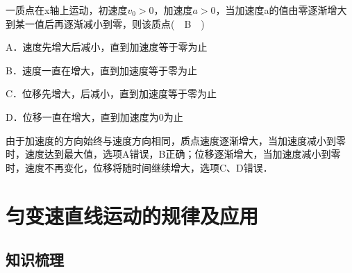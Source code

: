 \documentclass[cn,11pt]{elegantbook}
\begin{document}
\begin{enumerate}
\begin{enumerate}
         \end{enumerate}
         \begin{exercise}
            一质点在x轴上运动，初速度$v_{0}>0$，加速度$a>0$，当加速度a的值由零逐渐增大到某一值后再逐渐减小到零，则该质点(　B　)
           
            A．速度先增大后减小，直到加速度等于零为止
          
            B．速度一直在增大，直到加速度等于零为止
          
            C．位移先增大，后减小，直到加速度等于零为止
          
            D．位移一直在增大，直到加速度为0为止
            \begin{solution}
               由于加速度的方向始终与速度方向相同，质点速度逐渐增大，当加速度减小到零时，速度达到最大值，选项A错误，B正确；位移逐渐增大，当加速度减小到零时，速度不再变化，位移将随时间继续增大，选项C、D错误．

               
            \end{solution}
        
            
         \end{exercise}

      \end{enumerate}

   \section{匀变速直线运动的规律及应用}
   \subsection{知识梳理}
\end{document}
